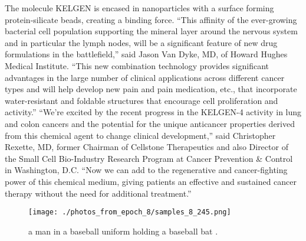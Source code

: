 \documentclass{article}%
\begin{document}
The molecule KELGEN is encased in nanoparticles with a surface forming protein{-}silicate beads, creating a binding force.\newline%
“This affinity of the ever{-}growing bacterial cell population supporting the mineral layer around the nervous system and in particular the lymph nodes, will be a significant feature of new drug formulations in the battlefield,” said Jason Van Dyke, MD, of Howard Hughes Medical Institute. “This new combination technology provides significant advantages in the large number of clinical applications across different cancer types and will help develop new pain and pain medication, etc., that incorporate water{-}resistant and foldable structures that encourage cell proliferation and activity.”\newline%
“We’re excited by the recent progress in the KELGEN{-}4 activity in lung and colon cancers and the potential for the unique anticancer properties derived from this chemical agent to change clinical development,” said Christopher Rexette, MD, former Chairman of Cellstone Therapeutics and also Director of the Small Cell Bio{-}Industry Research Program at Cancer Prevention \& Control in Washington, D.C. “Now we can add to the regenerative and cancer{-}fighting power of this chemical medium, giving patients an effective and sustained cancer therapy without the need for additional treatment.”\newline%

%


\begin{figure}[h!]%
\centering%
\texttt{[image: ./photos\_from\_epoch\_8/samples\_8\_245.png]}%
\caption{a man in a baseball uniform holding a baseball bat .}%
\end{figure}

%
\end{document}
